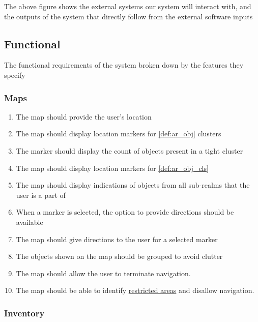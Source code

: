 \documentclass{article}
\begin{document}
The above figure shows the external systems our system will interact with, and the outputs of the system that directly follow from the external software inputs

\subsection{Functional}
\label{sub:functional}

The functional requirements of the system broken down by the features they specify

\subsubsection{Maps}
\label{ssub:maps}

\begin{enumerate}[align=left, label=\textbf{MP-FR\arabic*:}]
    \item The map should provide the user's location
    \item The map should display location markers for \ref{def:ar_obj} clusters
    \item The marker should display the count of objects present in a tight cluster
    \item The map should display location markers for \ref{def:ar_obj_cls}
    \item The map should display indications of objects from all sub-realms that the user is a part of
    \item When a marker is selected, the option to provide directions should be available
    \item The map should give directions to the user for a selected marker
    \item The objects shown on the map should be grouped to avoid clutter
    \item The map should allow the user to terminate navigation. \\
    \item The map should be able to identify \hyperref[def:restricted_area]{restricted areas} and disallow navigation.\\
\end{enumerate}

\subsubsection{Inventory}
\label{ssub:inventory}
\end{document}
